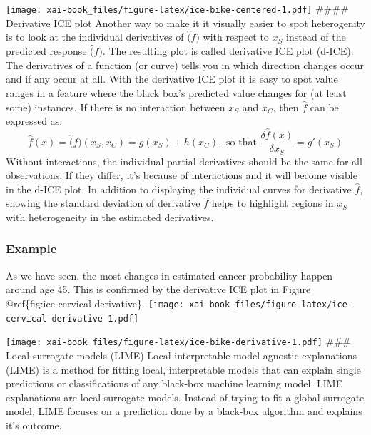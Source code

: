 \documentclass[12pt,]{krantz}
\theoremstyle{definition}
\theoremstyle{definition}
\theoremstyle{definition}
\theoremstyle{remark}
\begin{document}
\texttt{[image: xai-book\_files/figure-latex/ice-bike-centered-1.pdf]}
\#\#\#\# Derivative ICE plot Another way to make it it visually easier
to spot heterogenity is to look at the individual derivatives of
\(\hat(f)\) with respect to \(x_S\) instead of the predicted response
\(\hat(f)\). The resulting plot is called derivative ICE plot (d-ICE).
The derivatives of a function (or curve) tells you in which direction
changes occur and if any occur at all. With the derivative ICE plot it
is easy to spot value ranges in a feature where the black box's
predicted value changes for (at least some) instances. If there is no
interaction between \(x_S\) and \(x_C\), then \(\hat{f}\) can be
expressed as:
\[\hat{f}(x) = \hat(f)(x_S, x_C) = g(x_S) + h(x_C), \text{ so that } \frac{\delta\hat{f}(x)}{\delta x_S} = g'(x_S)\]
Without interactions, the individual partial derivatives should be the
same for all observations. If they differ, it's because of interactions
and it will become visible in the d-ICE plot. In addition to displaying
the individual curves for derivative \(\hat{f}\), showing the standard
deviation of derivative \(\hat{f}\) helps to highlight regions in
\(x_S\) with heterogeneity in the estimated derivatives.

\citep{goldstein2015peeking}

\subsubsection{Example}\label{example-2}

As we have seen, the most changes in estimated cancer probability happen
around age 45. This is confirmed by the derivative ICE plot in Figure
@ref\{fig:ice-cervical-derivative\}.
\texttt{[image: xai-book\_files/figure-latex/ice-cervical-derivative-1.pdf]}

\texttt{[image: xai-book\_files/figure-latex/ice-bike-derivative-1.pdf]}
\#\#\# Local surrogate models (LIME) Local interpretable model-agnostic
explanations (LIME) is a method for fitting local, interpretable models
that can explain single predictions or classifications of any black-box
machine learning model. LIME explanations are local surrogate models.
Instead of trying to fit a global surrogate model, LIME focuses on a
prediction done by a black-box algorithm and explains it's outcome.
\end{document}
